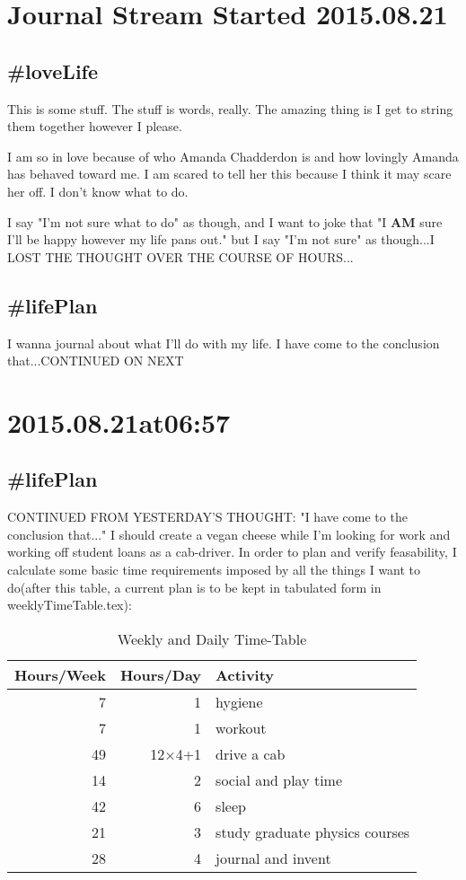\section*{Journal Stream Started 2015.08.21}

\subsection*{\#loveLife}
This is some stuff. The stuff is words, really. The amazing thing is I get to string them together however I please.

I am so in love because of who Amanda Chadderdon is and how lovingly Amanda has behaved toward me. I am scared to tell her this because I think it may scare her off. I don't know what to do.

I say "I'm not sure what to do" as though, and I want to joke that "I \textbf{AM} sure I'll be happy however my life pans out." but I say "I'm not sure" as though...I LOST THE THOUGHT OVER THE COURSE OF HOURS...

\subsection*{\#lifePlan}
I wanna journal about what I'll do with my life. I have come to the conclusion that...CONTINUED ON NEXT

\section*{2015.08.21at06:57}
\subsection*{\#lifePlan} CONTINUED FROM YESTERDAY'S THOUGHT:
"I have come to the conclusion that..." I should create a vegan cheese while I'm looking for work and working off student loans as a cab-driver. In order to plan and verify feasability, I calculate some basic time requirements imposed by all the things I want to do(after this table, a current plan is to be kept in tabulated form in weeklyTimeTable.tex):

\begin{table}
\caption{\label{tab:originalWeeklyAndDailyTimeTable}Weekly and Daily Time-Table}
\begin{tabular}{|r|r|l|}
\hline
Hours/Week&Hours/Day&Activity\\
\hline
7&1&hygiene\\
7&1&workout\\
49&12$\times$4+1&drive a cab\\
14&2&social and play time\\
42&6&sleep\\
21&3&study graduate physics courses\\
28&4&journal and invent\\
\hline
\end{tabular}\end{table}

